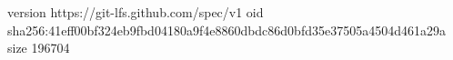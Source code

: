 version https://git-lfs.github.com/spec/v1
oid sha256:41eff00bf324eb9fbd04180a9f4e8860dbdc86d0bfd35e37505a4504d461a29a
size 196704
